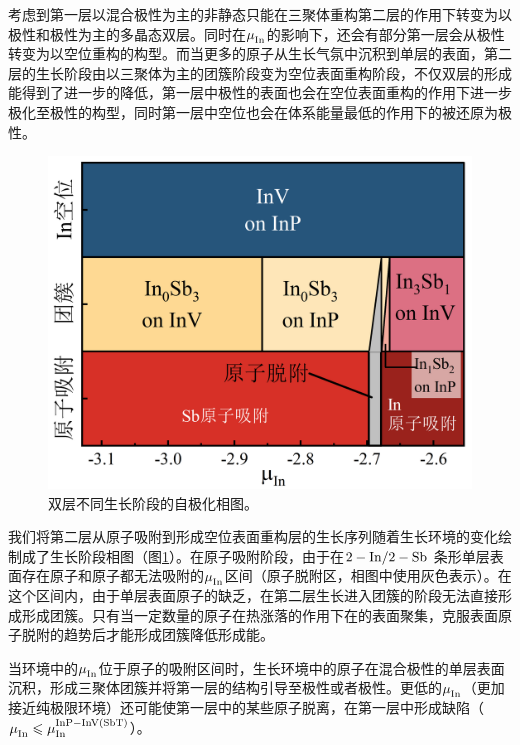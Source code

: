 考虑到第一层以混合极性为主的非静态只能在三聚体重构第二层的作用下转变为以极性和极性为主的多晶态双层。同时在$\it \mu_{\rm In}^{\rm } \it$的影响下，还会有部分第一层会从极性转变为以空位重构的构型。而当更多的原子从生长气氛中沉积到单层的表面，第二层的生长阶段由以三聚体为主的团簇阶段变为空位表面重构阶段，不仅双层的形成能得到了进一步的降低，第一层中极性的表面也会在空位表面重构的作用下进一步极化至极性的构型，同时第一层中空位也会在体系能量最低的作用下的被还原为极性。


\begin{figure}[htb]
    \includegraphics{pic/IS_DFT_stagePhase.png}
    \caption{双层不同生长阶段的自极化相图。}
    \label{fig:IS_DFT_stagePhase}
\end{figure}


我们将第二层从原子吸附到形成空位表面重构层的生长序列随着生长环境的变化绘制成了生长阶段相图（图\ref{fig:IS_DFT_stagePhase}）。在原子吸附阶段，由于在$\rm 2-In/2-Sb$ 条形单层表面存在原子和原子都无法吸附的$\it \mu_{\rm In}^{\rm } \it$区间（原子脱附区，相图中使用灰色表示）。在这个区间内，由于单层表面原子的缺乏，在第二层生长进入团簇的阶段无法直接形成形成团簇。只有当一定数量的原子在热涨落的作用下在的表面聚集，克服表面原子脱附的趋势后才能形成团簇降低形成能。

当环境中的$\it \mu_{\rm In}^{\rm } \it$位于原子的吸附区间时，生长环境中的原子在混合极性的单层表面沉积，形成三聚体团簇并将第一层的结构引导至极性或者极性。更低的$\it \mu_{\rm In}^{\rm } \it$（更加接近纯极限环境）还可能使第一层中的某些原子脱离，在第一层中形成缺陷（$\it \mu_{\rm In}^{\rm } \it\leqslant \it \mu_{\rm In}^{\rm InP-InV\left(SbT\right)} \it$）。

